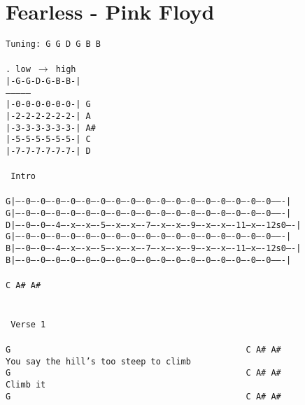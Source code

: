 \newpage
\section{Fearless - Pink Floyd}
\label{Fearless - Pink Floyd}
\texttt{Tuning:\ G\ G\ D\ G\ B\ B\\
\\
.\ low $\rightarrow$ high\\
|-G-G-D-G-B-B-|\\
---------------\\
|-0-0-0-0-0-0-|\ G\\
|-2-2-2-2-2-2-|\ A\\
|-3-3-3-3-3-3-|\ A\#\\
|-5-5-5-5-5-5-|\ C\\
|-7-7-7-7-7-7-|\ D\\
\\
\lbrack\ Intro\rbrack\\
\\
G|----0----0----0----0----0----0----0----0----0----0----0----0----0----0----0----0----0-------|\\
G|----0----0----0----0----0----0----0----0----0----0----0----0----0----0----0----0----0-------|\\
D|----0----0----4----x----x----5----x----x----7----x----x----9----x----x----11---x----12s0----|\\
G|----0----0----0----0----0----0----0----0----0----0----0----0----0----0----0----0----0-------|\\
B|----0----0----4----x----x----5----x----x----7----x----x----9----x----x----11---x----12s0----|\\
B|----0----0----0----0----0----0----0----0----0----0----0----0----0----0----0----0----0-------|\\
\\
C\ A\#\ A\#\\
\\
\\
\lbrack\ Verse\ 1\rbrack\\
\\
G\ \ \ \ \ \ \ \ \ \ \ \ \ \ \ \ \ \ \ \ \ \ \ \ \ \ \ \ \ \ \ \ \ \ \ \ \ \ \ \ \ \ \ \ \ \ \ C\ A\#\ A\#\\
You\ say\ the\ hill's\ too\ steep\ to\ climb\\
G\ \ \ \ \ \ \ \ \ \ \ \ \ \ \ \ \ \ \ \ \ \ \ \ \ \ \ \ \ \ \ \ \ \ \ \ \ \ \ \ \ \ \ \ \ \ \ C\ A\#\ A\#\\
Climb\ it\\
G\ \ \ \ \ \ \ \ \ \ \ \ \ \ \ \ \ \ \ \ \ \ \ \ \ \ \ \ \ \ \ \ \ \ \ \ \ \ \ \ \ \ \ \ \ \ \ C\ A\#\ A\#\\
}
